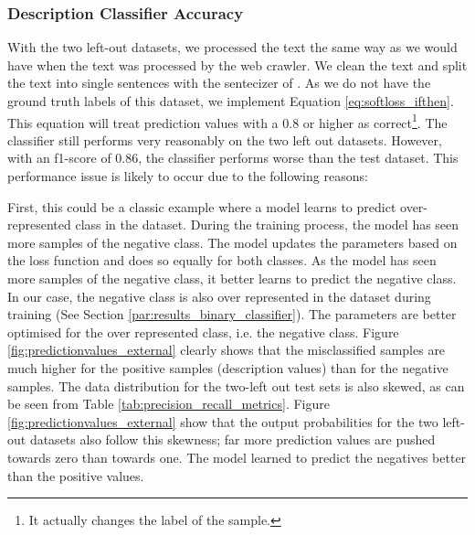 \documentclass[a4paper, 12pt, oneside]{book} %
\begin{document}
\subsubsection{Description Classifier Accuracy}
With the two left-out datasets, we processed the text the same way as we would have when the text was processed by the web crawler. 
We clean the text and split the text into single sentences with the sentecizer of \textcite{honnibal_spacy_2020}.
As we do not have the ground truth labels of this dataset, we implement Equation \ref{eq:softloss_ifthen}.
This equation will treat prediction values with a 0.8 or higher as correct\footnote{It actually changes the label of the sample.}.
The classifier still performs very reasonably on the two left out datasets.
However, with an f1-score of 0.86, the classifier performs worse than the test dataset.
This performance issue is likely to occur due to the following reasons:

First, this could be a classic example where a model learns to predict over-represented class in the dataset.
During the training process, the model has seen more samples of the negative class.
The model updates the parameters based on the loss function and does so equally for both classes.
As the model has seen more samples of the negative class, it better learns to predict the negative class.
In our case, the negative class is also over represented in the dataset during training (See Section \ref{par:results_binary_classifier}).
The parameters are better optimised for the over represented class, i.e. the negative class.
Figure \ref{fig:predictionvalues_external} clearly shows that the misclassified samples are much higher for the positive samples (description values) than for the negative samples. 
The data distribution for the two-left out test sets is also skewed, as can be seen from Table \ref{tab:precision_recall_metrics}.
Figure \ref{fig:predictionvalues_external} show that the output probabilities for the two left-out datasets also follow this skewness; far more prediction values are pushed towards zero than towards one.
The model learned to predict the negatives better than the positive values.
\end{document}
